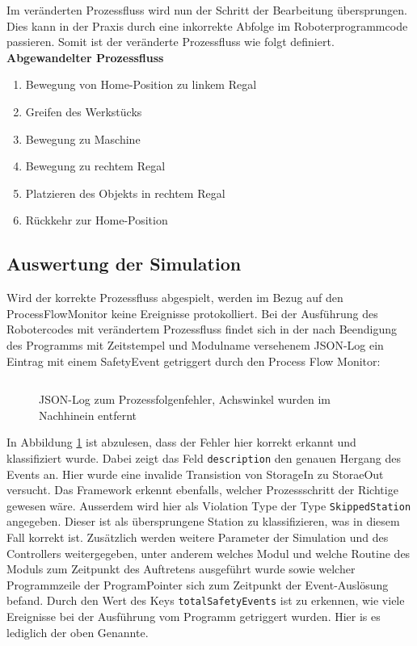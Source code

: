 Im veränderten Prozessfluss wird nun der Schritt der Bearbeitung übersprungen.
Dies kann in der Praxis durch eine inkorrekte Abfolge im Roboterprogrammcode
passieren. Somit ist der veränderte Prozessfluss wie folgt definiert.\\

\noindent
\textbf{Abgewandelter Prozessfluss}
\begin{enumerate}
	\item Bewegung von Home-Position zu linkem Regal
	\item Greifen des Werkstücks
	\item Bewegung zu Maschine
	\item Bewegung zu rechtem Regal
	\item Platzieren des Objekts in rechtem Regal
	\item Rückkehr zur Home-Position
\end{enumerate}

\subsection{Auswertung der Simulation}
Wird der korrekte Prozessfluss abgespielt, werden im Bezug auf den
ProcessFlowMonitor keine Ereignisse protokolliert.
Bei der Ausführung des Robotercodes mit verändertem Prozessfluss findet sich in
der nach Beendigung des Programms mit Zeitstempel und Modulname versehenem
JSON-Log ein Eintrag mit einem SafetyEvent getriggert durch den
Process Flow Monitor:
\begin{figure}[H]
	\inputminted[fontsize=\footnotesize]{json}{code-snippets/processflowerror.json}
	\caption{JSON-Log zum Prozessfolgenfehler, Achswinkel wurden im Nachhinein
		entfernt}
	\label{listing:processflowerror}
\end{figure}

\noindent In Abbildung \ref{listing:processflowerror} ist abzulesen, dass der
Fehler hier korrekt erkannt und klassifiziert wurde. Dabei zeigt das Feld
\texttt{description} den genauen Hergang des Events an. Hier wurde eine invalide
Transistion von StorageIn zu StoraeOut versucht. Das Framework erkennt
ebenfalls, welcher Prozessschritt der Richtige gewesen wäre. Ausserdem wird hier
als Violation Type der Type \texttt{SkippedStation} angegeben. Dieser ist als
übersprungene Station zu klassifizieren, was in diesem Fall korrekt ist.
Zusätzlich werden weitere Parameter der Simulation und des Controllers
weitergegeben, unter anderem welches Modul und welche Routine des Moduls zum
Zeitpunkt des Auftretens ausgeführt wurde sowie welcher Programmzeile der
ProgramPointer sich zum Zeitpunkt der Event-Auslösung befand. Durch den Wert des
Keys \texttt{totalSafetyEvents} ist zu erkennen, wie viele Ereignisse bei der
Ausführung vom Programm getriggert wurden. Hier is es lediglich der oben
Genannte.

